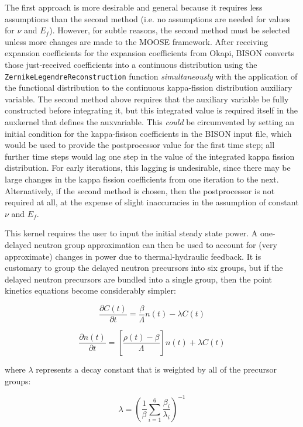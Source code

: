 \documentclass[10pt]{article}
\newcommand{\beq}{\begin{equation}}
\newcommand{\eeq}{\end{equation}}
\numberwithin{equation}{section} %
\begin{document}
The first approach is more desirable and general because it requires less assumptions than the second method (i.e. no assumptions are needed for values for \(\nu\) and \(E_f\)). However, for subtle reasons, the second method must be selected unless more changes are made to the MOOSE framework. After receiving expansion coefficients for the expansion coefficients from Okapi, BISON converts those just-received coefficients into a continuous distribution using the {\tt ZernikeLegendreReconstruction} function {\it simultaneously} with the application of the functional distribution to the continuous kappa-fission distribution auxiliary variable. The second method above requires that the auxiliary variable be fully constructed before integrating it, but this integrated value is required itself in the auxkernel that defines the auxvariable. This {\it could} be circumvented by setting an initial condition for the kappa-fisison coefficients in the BISON input file, which would be used to provide the postprocessor value for the first time step; all further time steps would lag one step in the value of the integrated kappa fission distribution. For early iterations, this lagging is undesirable, since there may be large changes in the kappa fission coefficients from one iteration to the next. Alternatively, if the second method is chosen, then the postprocessor is not required at all, at the expense of slight inaccuracies in the assumption of constant \(\nu\) and \(E_f\).

This kernel requires the user to input the initial steady state power. A one-delayed neutron group approximation can then be used to account for (very approximate) changes in power due to thermal-hydraulic feedback. It is customary to group the delayed neutron precursors into six groups, but if the delayed neutron precursors are bundled into a single group, then the point kinetics equations become considerably simpler:

\beq
\label{eq:PointKineticsPrecursor_OneDelayedGroup}
\frac{\partial C(t)}{\partial t}=\frac{\beta}{\Lambda}n(t)-\lambda C(t)
\eeq

\beq
\label{eq:PointKineticsNeutrons_OneDelayedGroup}
\frac{\partial n(t)}{\partial t}=\left\lbrack\frac{\rho(t)-\beta}{\Lambda}\right\rbrack n(t)+\lambda C(t)
\eeq

where \(\lambda\) represents a decay constant that is weighted by all of the precursor groups:

\beq
\label{eq:Lambda_OneGroup}
\lambda=\left(\frac{1}{\beta}\sum_{i=1}^{6}\frac{\beta_i}{\lambda_i}\right)^{-1}
\eeq
\end{document}
